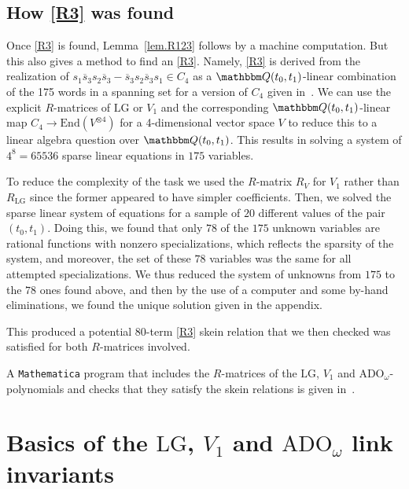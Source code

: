 \documentclass[12pt,reqno]{amsart}
\theoremstyle{definition}
\def\BQ{\mathbbm Q}
\def\hs{\overline{s}}
\def\LG{\mathrm{LG}}
\def\ADO{\mathrm{ADO}}
\begin{document}
\subsection{How \texorpdfstring{\eqref{R3}}{R3} was found}
\label{sub.how}

Once \eqref{R3} is found, Lemma~\ref{lem.R123} follows by a machine
computation. But this also gives a method to find an \eqref{R3}. 
Namely, \eqref{R3} is derived from the realization of
$s_1 \hs_3 s_2 \hs_3 - \hs_3 s_2 \hs_3 s_1 \in C_4$ as a $\BQ(t_0,t_1)$-linear
combination of the 175 words in a 
spanning set for a version of $C_4$ given in~\cite{MW}.
We can use the explicit $R$-matrices of $\LG$ or $V_1$ and the
corresponding $\BQ(t_0,t_1)$-linear map $C_4 \to \mathrm{End}(V^{\otimes 4})$
for a 4-dimensional vector space $V$ to reduce this to a linear algebra
question over $\BQ(t_0,t_1)$. This results in solving a system of $4^8=65536$
sparse linear equations in $175$ variables. 

To reduce the complexity of the task we used the $R$-matrix $R_V$ for $V_1$
rather than $R_{\LG}$ since the former appeared to have simpler coefficients.
Then, we solved the sparse linear system of equations 
for a sample of $20$ different values of the pair $(t_0,t_1)$. Doing this, we found
that only $78$ of the $175$ unknown variables are rational
functions with nonzero specializations, which reflects the sparsity of the system,
and moreover, the set of these $78$ variables was the same for all attempted
specializations. We thus reduced the system of unknowns from $175$ to the $78$
ones found above, and then by the use of a computer and some by-hand eliminations,
we found the unique solution given in the appendix.

This produced a potential $80$-term \eqref{R3} skein relation that we
then checked was satisfied for both $R$-matrices involved.

A \texttt{Mathematica} program that includes the $R$-matrices of the $\LG$, $V_1$
and $\ADO_\omega$-polynomials and checks that they satisfy the skein relations is
given in~\cite{data}. 


\section{Basics of the \texorpdfstring{$\LG$}{LG},
  \texorpdfstring{$V_1$}{V1} and
  \texorpdfstring{$\ADO_\omega$}{ADO} link invariants}
\label{sec.RT}
\end{document}
